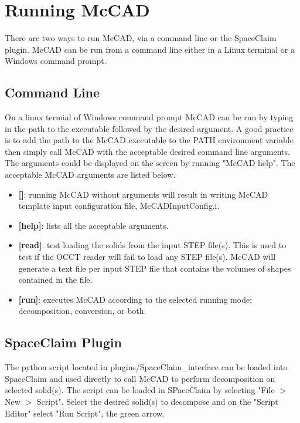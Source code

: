 \documentclass[12pt, a4paper, titlepage]{article}
\begin{document}
\section{Running McCAD} \label{sec:Running McCAD}
There are two ways to run McCAD, via a command line or the SpaceClaim plugin. McCAD can be run from a command line either in a Linux terminal or a Windows command prompt.

  \subsection{Command Line}
    On a linux termial of Windows command prompt McCAD can be run by typing in the path to the executable followed by the desired argument. A good practice is to add the path to the McCAD executable to the PATH environment variable then simply call McCAD with the acceptable desired command line arguments. The arguments could be displayed on the screen by running "McCAD help". The acceptable McCAD arguments are listed below.
    \begin{itemize}
      \item \textbf{[]}: running McCAD without arguments will result in writing McCAD template input configuration file, McCADInputConfig.i.
      \item \textbf{[help]}: lists all the acceptable arguments.
      \item \textbf{[read]}: test loading the solids from the input STEP file(s). This is used to test if the OCCT reader will fail to load any STEP file(s). McCAD will generate a text file per input STEP file that contains the volumes of shapes contained in the file.
      \item \textbf{[run]}: executes McCAD according to the selected running mode: decomposition, conversion, or both. 
    \end{itemize}

  \subsection{SpaceClaim Plugin}
    The python script located in plugins/SpaceClaim\_interface can be loaded into SpaceClaim and used directly to call McCAD to perform decomposition on selected solid(s).  The script can be loaded in SPaceClaim by selecting "File $>$ New $>$ Script". Select the desired solid(s) to decompose and on the "Script Editor" select "Run Script", the green arrow.
\end{document}
